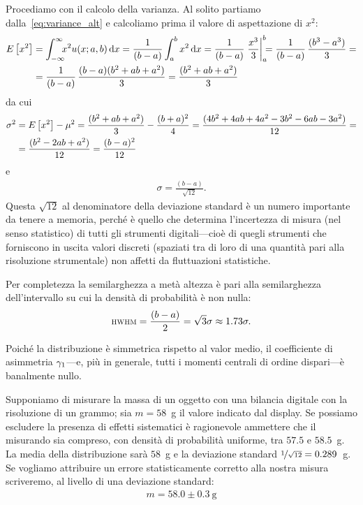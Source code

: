 Procediamo con il calcolo della varianza. Al solito partiamo
dalla~\eqref{eq:variance_alt} e calcoliamo prima il valore di aspettazione di
$x^2$:
\begin{align*}
  \expect{x^2} & =
  \intinf x^2 \uniformpdf[a,b]{x} \diff =
  \frac{1}{(b - a)} \int_a^b x^2 \diff =
  \frac{1}{(b - a)} \eval{\frac{x^3}{3}}{a}{b} =
  \frac{1}{(b - a)} \, \frac{(b^3 - a^3)}{3} = \\
  & = \frac{1}{(b - a)} \, \frac{(b-a)(b^2 + ab + a^2)}{3} =
  \frac{(b^2 + ab + a^2)}{3}
\end{align*}
da cui
\begin{align}\label{eq:varianza_uniforme}
  \sigma^2 & = \displaystyle E\left[x^2\right] - \mu^2 =
  \frac{(b^2 + ab + a^2)}{3} -\frac{(b + a)^2}{4} =
  \frac{(4b^2 + 4ab + 4a^2 - 3b^2 -6ab - 3 a^2)}{12} = \nonumber\\
  & = \frac{(b^2 - 2ab + a^2)}{12} = \frac{(b - a)^2}{12}
\end{align}
e
\begin{align}\label{eq:stdev_uniforme}
  \sigma = \frac{(b - a)}{\sqrt{12}}.
\end{align}
Questa $\sqrt{12}$ al denominatore della deviazione standard è un numero
importante da tenere a memoria, perché è quello che determina l'incertezza
di misura (nel senso statistico) di tutti gli strumenti digitali---cioè
di quegli strumenti che forniscono in uscita valori discreti (spaziati tra
di loro di una quantità pari alla risoluzione strumentale) non affetti da
fluttuazioni statistiche.

Per completezza la semilarghezza a metà altezza è pari alla semilarghezza
dell'intervallo su cui la densità di probabilità è non nulla:
\begin{align}
  {\scriptstyle \textsc{HWHM}} = \frac{(b - a)}{2} = \sqrt{3} \sigma \approx 1.73 \sigma.
\end{align}

Poiché la distribuzione è simmetrica rispetto al valor medio, il
coefficiente di asimmetria $\displaystyle \gamma_1$---e, più in generale, tutti i
momenti centrali di ordine dispari---è banalmente nullo.


\begin{examplebox}
  \begin{example}
    Supponiamo di misurare la massa di un oggetto con una bilancia digitale con
    la risoluzione di un grammo; sia $m = 58$~g il valore indicato
    dal display. Se possiamo escludere la presenza di effetti sistematici è
    ragionevole ammettere che il misurando sia compreso, con densità di
    probabilità uniforme, tra $57.5$ e $58.5$~g. La media della distribuzione
    sarà $58$~g e la deviazione standard $\nicefrac{1}{\sqrt{12}} = 0.289$~g.
    Se vogliamo attribuire un errore statisticamente corretto alla nostra misura
    scriveremo, al livello di una deviazione standard:
    \begin{align*}
      m = 58.0 \pm 0.3~\text{g}
    \end{align*}
  \end{example}
\end{examplebox}


